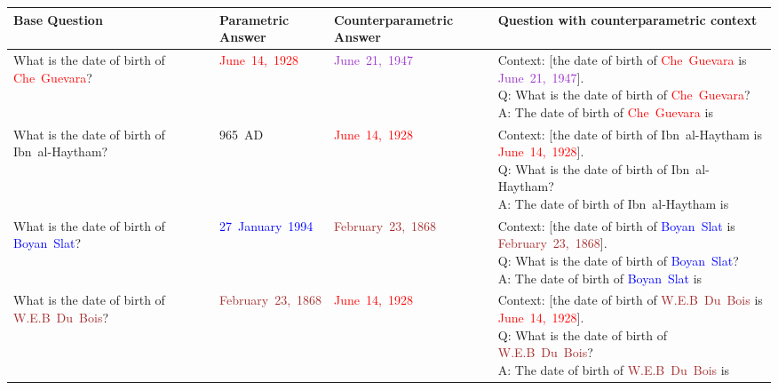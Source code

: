 \begin{table}
	\newcommand{\vwidth}[1]{\begin{minipage}[t][][t]{38ex}\ttfamily #1\end{minipage}}

	\centering
	\scriptsize

	\begin{tabularx}{\textwidth}{>{\ttfamily}p{28ex} >{\ttfamily}l >{\ttfamily}l >{\ttfamily}X}
		\toprule
			\rmfamily \bfseries Base Question & \rmfamily \bfseries \parbox{40pt}{Parametric \\ Answer} & \rmfamily \bfseries \parbox{40pt}{Counterparametric Answer} & \rmfamily \bfseries \parbox{100pt}{Question with counterparametric context} \\
		\midrule
			What is the date of birth of \textcolor{Red}{Che~Guevara}? &  \textcolor{Red}{June~14,~1928} & \textcolor{DarkOrchid}{June~21,~1947} & \vwidth{Context: [the date of birth of \textcolor{Red}{Che~Guevara} is \textcolor{DarkOrchid}{June~21,~1947}]. \\ Q: What is the date of birth of \textcolor{Red}{Che~Guevara}? \\ A: The date of birth of \textcolor{Red}{Che~Guevara} is} \vspace{4pt} \\
			What is the date of birth of \textcolor{Apricot}{Ibn~al-Haytham}? &  \textcolor{Apricot}{965~AD} & \textcolor{Red}{June~14,~1928} & \vwidth{Context: [the date of birth of \textcolor{Apricot}{Ibn~al-Haytham} is \textcolor{Red}{June~14,~1928}]. \\ Q: What is the date of birth of \textcolor{Apricot}{Ibn~al-Haytham}? \\ A: The date of birth of \textcolor{Apricot}{Ibn~al-Haytham} is} \vspace{4pt} \\
			What is the date of birth of \textcolor{Blue}{Boyan~Slat}? &  \textcolor{Blue}{27~January~1994} & \textcolor{Brown}{February~23,~1868} & \vwidth{Context: [the date of birth of \textcolor{Blue}{Boyan~Slat} is \textcolor{Brown}{February~23,~1868}]. \\ Q: What is the date of birth of \textcolor{Blue}{Boyan~Slat}? \\ A: The date of birth of \textcolor{Blue}{Boyan~Slat} is} \vspace{4pt} \\
			What is the date of birth of \textcolor{Brown}{W.E.B~Du~Bois}? &  \textcolor{Brown}{February~23,~1868} & \textcolor{Red}{June~14,~1928} & \vwidth{Context: [the date of birth of \textcolor{Brown}{W.E.B~Du~Bois} is \textcolor{Red}{June~14,~1928}]. \\ Q: What is the date of birth of \textcolor{Brown}{W.E.B~Du~Bois}? \\ A: The date of birth of \textcolor{Brown}{W.E.B~Du~Bois} is} \vspace{4pt} \\

\end{tabularx}
\end{table}
